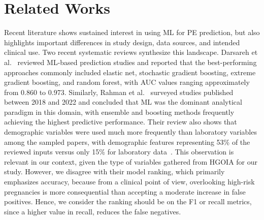\documentclass[diagnostics,article,submit,pdftex,moreauthors]{Definitions/mdpi}
\begin{document}
\section{Related Works}
\label{sec:related-works}
Recent literature shows sustained interest in using \ac{ML} for
\ac{PE} prediction, but also highlights important differences in
study design, data sources, and intended clinical use. Two recent
systematic reviews synthesize this landscape. Darsareh et
al.~\cite{Darsareh2024} reviewed \ac{ML}-based prediction studies and
reported that the best-performing approaches commonly included elastic
net, stochastic gradient boosting, extreme gradient boosting, and
random forest, with \ac{AUC} values ranging approximately from 0.860 to
0.973. Similarly, Rahman et al.~\cite{Rahman2023} surveyed studies
published between 2018 and 2022 and concluded that \ac{ML} was the
dominant analytical paradigm in this domain, with ensemble and
boosting methods frequently achieving the highest predictive
performance. Their review also shows that demographic variables were
used much more frequently than laboratory variables among the sampled
papers, with demographic features representing 53\% of the reviewed
inputs versus only 15\% for laboratory data~\cite{Rahman2023}. This
observation is relevant in our context, given the type of variables
gathered from \ac{HGOIA} for our study. However, we
disagree with their model ranking, which primarily emphasizes
accuracy, because from a clinical point of view, overlooking high-risk
pregnancies is more consequential than accepting a moderate increase
in false positives. Hence, we consider the ranking should be on the
\ac{F1} or recall metrics, since a higher value in recall, reduces the
false negatives.
\end{document}
